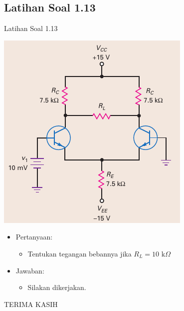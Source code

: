\documentclass[aspectratio=169]{beamer}
\begin{document}
\subsection{Latihan Soal 1.13}
\begin{frame}{Latihan Soal 1.13}
	\begin{multicols}{2}
		\begin{center}
			\includegraphics[height=0.6\textheight]{gambar/01.fig32}
		\end{center}
		\columnbreak
		\begin{itemize}
			\item Pertanyaan:
			\begin{itemize}
				\item Tentukan tegangan bebannya jika $ R_L = 10 \text{ k}\Omega $
			\end{itemize}
			\item Jawaban:
			\begin{itemize}
				\item Silakan dikerjakan.
			\end{itemize}
		\end{itemize}
	\end{multicols}
\end{frame}

\begin{frame}
	\centering TERIMA KASIH
\end{frame}
\end{document}

